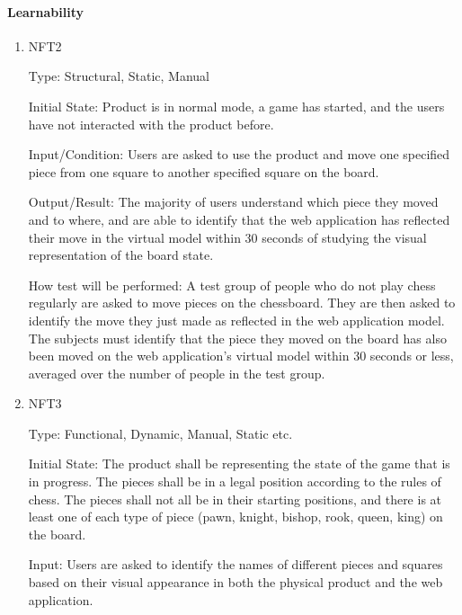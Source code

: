 \documentclass[12pt, titlepage]{article}
\begin{document}
\paragraph{Learnability}
\begin{enumerate}
    \item{NFT2}

        Type: Structural, Static, Manual
                            
        Initial State: Product is in normal mode, a game has started, and the users have not interacted with the product before. 
                            
        Input/Condition: Users are asked to use the product and move one specified piece from one square to another specified square on the board.
                            
        Output/Result: The majority of users understand which piece they moved and to where, and are able to identify that the web application 
            has reflected their move in the virtual model within 30 seconds of studying the visual representation of the board state.
                            
        How test will be performed: A test group of people who do not play chess regularly are asked to move pieces on the chessboard. They are 
            then asked to identify the move they just made as reflected in the web application model. The subjects must identify that the piece they
            moved on the board has also been moved on the web application's virtual model within 30 seconds or less, averaged over the number of people
            in the test group.
                        
    \item{NFT3}

        Type: Functional, Dynamic, Manual, Static etc.
                            
        Initial State: The product shall be representing the state of the game that is in progress. The pieces shall be in a legal position according to 
            the rules of chess. The pieces shall not all be in their starting positions, and there is at least one of each type of piece 
            (pawn, knight, bishop, rook, queen, king) on the board.
                            
        Input: Users are asked to identify the names of different pieces and squares based on their visual appearance in both the 
            physical product and the web application.
                            

\end{enumerate}
\end{document}
